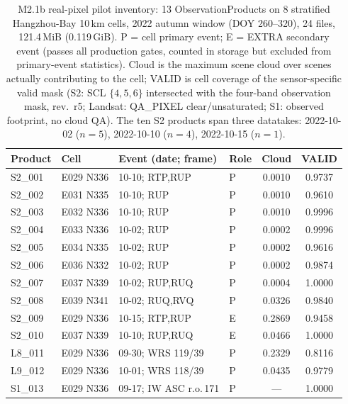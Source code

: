 \begin{table}[t]
\centering
\small
\caption{M2.1b real-pixel pilot inventory: 13 ObservationProducts on 8
stratified Hangzhou-Bay 10\,km cells, 2022 autumn window (DOY 260--320),
24 files, 121.4\,MiB (0.119\,GiB). P = cell primary event;
E = EXTRA secondary event (passes all production gates, counted in
storage but excluded from primary-event statistics). Cloud is the
maximum scene cloud over scenes actually contributing to the cell;
VALID is cell coverage of the sensor-specific valid mask (S2: SCL
$\{4,5,6\}$ intersected with the four-band observation mask, rev.~r5;
Landsat: QA\_PIXEL clear/unsaturated; S1: observed footprint, no cloud
QA). The ten S2 products span three datatakes: 2022-10-02 ($n=5$),
2022-10-10 ($n=4$), 2022-10-15 ($n=1$).}
\label{tab:m21b}
\begin{tabular}{llllcc}
\toprule
Product & Cell & Event (date; frame) & Role & Cloud & VALID \\
\midrule
S2\_001 & E029 N336 & 10-10; RTP,RUP & P & 0.0010 & 0.9737 \\
S2\_002 & E031 N335 & 10-10; RUP     & P & 0.0010 & 0.9610 \\
S2\_003 & E032 N336 & 10-10; RUP     & P & 0.0010 & 0.9996 \\
S2\_004 & E033 N336 & 10-02; RUP     & P & 0.0002 & 0.9996 \\
S2\_005 & E034 N335 & 10-02; RUP     & P & 0.0002 & 0.9616 \\
S2\_006 & E036 N332 & 10-02; RUP     & P & 0.0002 & 0.9874 \\
S2\_007 & E037 N339 & 10-02; RUP,RUQ & P & 0.0004 & 1.0000 \\
S2\_008 & E039 N341 & 10-02; RUQ,RVQ & P & 0.0326 & 0.9840 \\
S2\_009 & E029 N336 & 10-15; RTP,RUP & E & 0.2869 & 0.9458 \\
S2\_010 & E037 N339 & 10-10; RUP,RUQ & E & 0.0466 & 1.0000 \\
L8\_011 & E029 N336 & 09-30; WRS 119/39 & P & 0.2329 & 0.8116 \\
L9\_012 & E029 N336 & 10-01; WRS 118/39 & P & 0.0435 & 0.9779 \\
S1\_013 & E029 N336 & 09-17; IW ASC r.o.\,171 & P & --- & 1.0000 \\
\bottomrule
\end{tabular}
\end{table}
